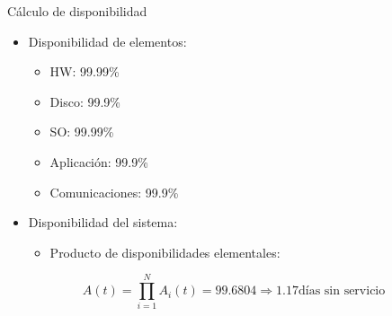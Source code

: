 \begin{frame}{Cálculo de disponibilidad}
\begin{itemize}
  \item Disponibilidad de elementos:
    \begin{itemize}
      \item HW: 99.99\%
      \item Disco: 99.9\%
      \item SO: 99.99\%
      \item Aplicación: 99.9\%
      \item Comunicaciones: 99.9\%
    \end{itemize}

  \item Disponibilidad del sistema:
    \begin{itemize}
      \item Producto de disponibilidades elementales:
    \end{itemize}
\end{itemize}
\begin{equation*}
A(t) = \prod_{i=1}^{N} A_i(t) = 99.6804 \Rightarrow 1.17 \text{días sin servicio}
\end{equation*}
\end{frame}
